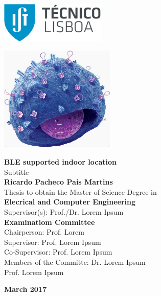\setcounter{page}{1} 


\thispagestyle{empty}
\begin{flushleft} ~\\ \vspace{-12mm} \hspace{-12mm}  \includegraphics[width=50mm]{Figures/Cover/istnewlogo.jpg} 
\vspace{10mm}
\\ \begin{center} \includegraphics[height=50mm]{Figures/Cover/coverimage}  \end{center} %
 \vspace{5mm}
\centering
\LARGE \textbf{BLE supported indoor location}
\\ \vspace{10mm}
\Large Subtitle
\\ \vspace{15mm}
\Large \textbf{Ricardo Pacheco Pais Martins} \\
\vspace{12mm}
\large Thesis to obtain the Master of Science Degree in
\\ \vspace{2mm}
\LARGE \textbf{Elecrical and Computer Engineering}
\\ \vspace{10mm}
\large Supervisor(s): Prof./Dr. Lorem Ipsum
\\ \vspace{15mm}
\Large \textbf{Examinatiom Committee}
\\ \vspace{5mm}
\large Chairperson:	Prof. Lorem \\
\large Supervisor: Prof. Lorem Ipsum\\
\large Co-Supervisor: Prof. Lorem Ipsum \\
\large Members of the Committe: Dr. Lorem Ipsum \\
Prof. Lorem Ipsum
 
\vspace{15mm}

\Large \textbf{March 2017} \\
\let\thepage\relax
\end{flushleft}
